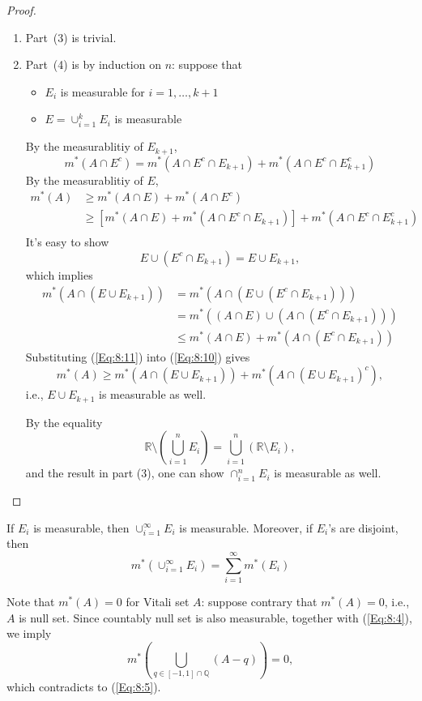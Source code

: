 \begin{proof}
\begin{enumerate}
\item
Part~(3) is trivial.
\item
Part~(4) is by induction on $n$:
suppose that
\begin{itemize}
\item
$E_i$ is measurable for $i=1,\dots,k+1$
\item
$E=\cup_{i=1}^kE_i$ is measurable
\end{itemize}
By the measurablitiy of $E_{k+1}$,
\begin{equation}\label{Eq:8:9}
m^*(A\cap E^c) = m^*(A\cap E^c\cap E_{k+1})+m^*(A\cap E^c\cap E_{k+1}^c)
\end{equation}
By the measurablitiy of $E$,
\begin{equation}\label{Eq:8:10}
\begin{aligned}
m^*(A)&\ge m^*(A\cap E)+m^*(A\cap E^c)\\&\ge
 [m^*(A\cap E)+m^*(A\cap E^c\cap E_{k+1})]+m^*(A\cap E^c\cap E_{k+1}^c)\\
\end{aligned}
\end{equation}
It's easy to show
\[
E\cup(E^c\cap E_{k+1})=E\cup E_{k+1},
\]
which implies
\begin{equation}\label{Eq:8:11}
\begin{aligned}
m^*(A\cap (E\cup E_{k+1}))&=m^*(A\cap (E\cup(E^c\cap E_{k+1})))\\
&=m^*((A\cap E)\cup(A\cap (E^c\cap E_{k+1})))\\
&\le m^*(A\cap E)+m^*(A\cap (E^c\cap E_{k+1}))
\end{aligned}
\end{equation}
Substituting (\ref{Eq:8:11}) into (\ref{Eq:8:10}) gives
\[
m^*(A)\ge m^*(A\cap (E\cup E_{k+1}))+m^*(A\cap (E\cup E_{k+1})^c),
\]
i.e., $E\cup E_{k+1}$ is measurable as well.

By the equality
\[
\mathbb{R}\setminus\left(\bigcup_{i=1}^n E_i\right) = \bigcup_{i=1}^n(\mathbb{R}\setminus E_i),
\]
and the result in part (3), one can show $\cap_{i=1}^n E_i$ is measurable as well.
\end{enumerate}
\end{proof}


\begin{proposition}
If $E_i$ is measurable, then $\cup_{i=1}^\infty E_i$ is measurable.
Moreover, if $E_i$'s are disjoint, then
\[
m^*(\cup_{i=1}^\infty E_i) = \sum_{i=1}^\infty m^*(E_i)
\]
\end{proposition}

\begin{remark}
Note that $m^*(A)=0$ for Vitali set $A$: suppose contrary that $m^*(A)=0$, i.e., $A$ is null set.
Since countably null set is also measurable, together with (\ref{Eq:8:4}), we imply
\[
m^*\left(\bigcup_{q\in[-1,1]\cap\mathbb{Q}}(A-q)\right)=0,
\]
which contradicts to (\ref{Eq:8:5}).
\end{remark}

